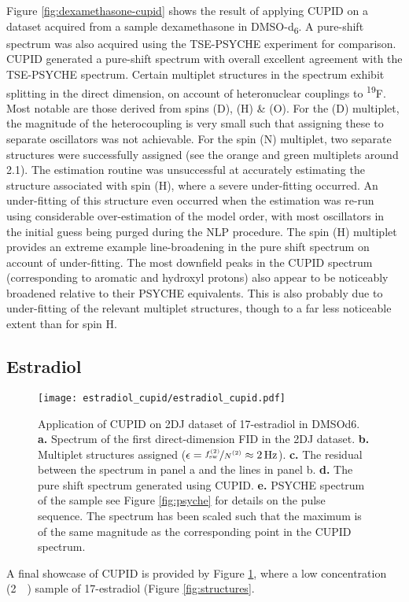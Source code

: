 Figure \ref{fig:dexamethasone-cupid} shows the result of applying CUPID on a
dataset acquired from a sample dexamethasone in DMSO-d\textsubscript{6}. A
pure-shift spectrum was also acquired using the
\ac{TSE-PSYCHE} experiment\cite{Foroozandeh2018,Foroozandeh2015} for
comparison.
\ac{CUPID} generated a pure-shift spectrum with overall excellent agreement
with the \ac{TSE-PSYCHE} spectrum. Certain multiplet structures in the spectrum exhibit
splitting in the direct dimension, on account of heteronuclear couplings to
\textsuperscript{19}F. Most notable are those derived from spins (D), (H) \& (O). For the (D) multiplet, the
magnitude of the heterocoupling is very small such that assigning these to
separate oscillators was not achievable.
For the spin (N) multiplet, two separate structures were successfully assigned
(see the orange and green multiplets around \qty{2.1}{\partspermillion}).
The estimation routine was unsuccessful at accurately estimating the structure
associated with spin (H), where a severe under-fitting occurred. An under-fitting
of this structure even occurred when the estimation was re-run using
considerable over-estimation of the model order, with most oscillators in the
initial guess being purged during the \ac{NLP} procedure.
The spin (H) multiplet provides an extreme example line-broadening in the pure
shift spectrum on account of under-fitting. The most downfield peaks in the
CUPID spectrum (corresponding to aromatic and hydroxyl protons) also appear to
be noticeably broadened relative to their PSYCHE equivalents. This is also
probably due to under-fitting of the relevant multiplet structures, though to a
far less noticeable extent than for spin H. 

\subsection{Estradiol}
\begin{figure}
    \texttt{[image: estradiol\_cupid/estradiol\_cupid.pdf]}%
    \caption[
        Application of \acs{CUPID} on a 17\textbeta-estradiol dataset.
    ]{
        Application of \acs{CUPID} on \ac{2DJ} dataset of 17\textbeta-estradiol
        in \acs{DMSOd6}.
        \textbf{a.} Spectrum of the first direct-dimension \ac{FID} in the
        \ac{2DJ} dataset.
        \textbf{b.} Multiplet structures assigned ($\epsilon =
        \nicefrac{\fswtwo}{\Ntwo} \approx \qty{2}{\hertz}$).
        \textbf{c.} The residual between the spectrum in panel a and the lines
        in panel b.
        \textbf{d.} The pure shift spectrum generated using \ac{CUPID}.
        \textbf{e.} \acs{PSYCHE} spectrum of the sample see Figure
        \ref{fig:psyche} for details on the pulse sequence. The spectrum has
        been scaled such that the maximum is of the same magnitude as the
        corresponding point in the \ac{CUPID} spectrum.
    }
    \label{fig:estradiol-cupid}%
\end{figure}

A final showcase of \ac{CUPID} is provided by Figure \ref{fig:estradiol-cupid}, where a low concentration (\qty{2}{\milli\molar}) sample of 17\textbeta-estradiol (Figure \ref{fig:structures}.
